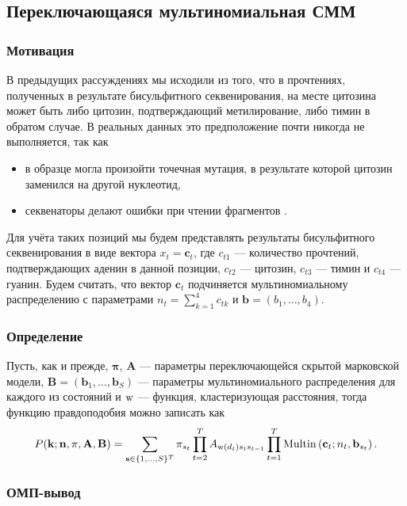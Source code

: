 \subsection{Переключающаяся мультиномиальная СММ}

\subsubsection{Мотивация}

В предыдущих рассуждениях мы исходили из того, что в прочтениях, полученных
в результате бисульфитного секвенирования, на месте цитозина может быть либо
цитозин, подтверждающий метилирование, либо тимин в обратом случае.
В реальных данных это предположение почти никогда не выполняется, так как
\begin{itemize}
\item в образце могла произойти точечная мутация, в результате которой
  цитозин заменился на другой нуклеотид,
\item секвенаторы делают ошибки при чтении фрагментов \cite{minoche2011evaluation}.
\end{itemize}

Для учёта таких позиций мы будем представлять результаты бисульфитного секвенирования
в виде вектора $x_t = \mathbf{c}_t$, где $c_{t1}$ --- количество прочтений, подтверждающих
аденин в данной позиции, $c_{t2}$ --- цитозин, $c_{t3}$ --- тимин и $c_{t4}$ --- гуанин.
Будем считать, что вектор $\mathbf{c}_t$ подчиняется мультиномиальному распределению с параметрами
$n_t = \sum\limits_{k = 1}^4 c_{tk}$ и $\mathbf{b} = (b_1, \ldots, b_4)$.

\subsubsection{Определение}

Пусть, как и прежде, $\mathbf{\pi}$, $\mathbf{A}$ --- параметры переключающейся
скрытой марковской модели, $\mathbf{B} = (\mathbf{b}_1, \ldots, \mathbf{b}_S)$
--- параметры мультиномиального распределения для каждого из состояний и
$\operatorname{w}$ --- функция, кластеризующая расстояния, тогда функцию правдоподобия можно
записать как
$$
P(\mathbf{k}; \mathbf{n}, \mathbf{\pi}, \mathbf{A}, \mathbf{B})
= \sum\limits_{\mathbf{s} \in \{1, \ldots, S\}^T}
  \pi_{s_t}
  \prod\limits_{t = 2}^T A_{\operatorname{w}(d_t) s_t s_{t - 1}}
  \prod\limits_{t = 1}^T \operatorname{Multin}\left(\mathbf{c}_t; n_t, \mathbf{b}_{s_t}\right).
$$

\subsubsection{ОМП-вывод}

